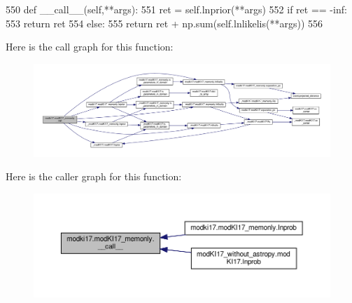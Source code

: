 \begin{DoxyCode}
550     \textcolor{keyword}{def }\_\_call\_\_(self,**args):
551         ret = self.lnprior(**args)
552         \textcolor{keywordflow}{if} ret == -inf:
553             \textcolor{keywordflow}{return} ret
554         \textcolor{keywordflow}{else}:
555             \textcolor{keywordflow}{return} ret + np.sum(self.lnlikelis(**args)) 
556         
\end{DoxyCode}
Here is the call graph for this function\+:\nopagebreak
\begin{figure}[H]
\begin{center}
\leavevmode
\includegraphics[width=350pt]{df/da2/classmodki17_1_1modKI17__memonly_a9c3df4e62b2a34f1bde0835d75c4afdf_cgraph}
\end{center}
\end{figure}
Here is the caller graph for this function\+:\nopagebreak
\begin{figure}[H]
\begin{center}
\leavevmode
\includegraphics[width=350pt]{df/da2/classmodki17_1_1modKI17__memonly_a9c3df4e62b2a34f1bde0835d75c4afdf_icgraph}
\end{center}
\end{figure}
\mbox{\label{classmodki17_1_1modKI17__memonly_a32029497de5993152e902e6cee8554c9}} 
